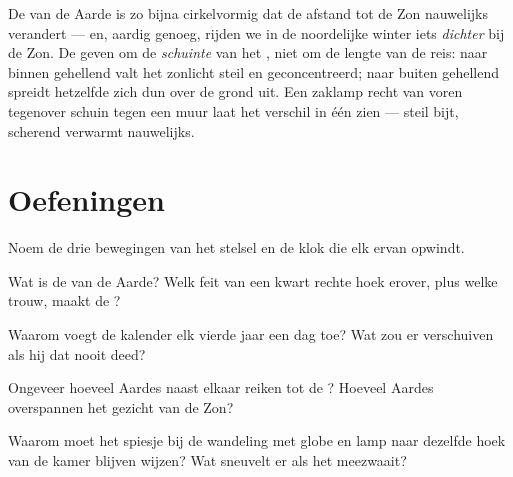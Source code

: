 \begin{remark}\label{rem:g6:sun-earth-moon:notdistance}
De  van de Aarde is zo bijna cirkelvormig dat de afstand
tot de Zon nauwelijks verandert --- en, aardig genoeg, rijden we in de
noordelijke winter iets \emph{dichter} bij de Zon. De  geven
om de \emph{schuinte} van het , niet om de lengte van de reis:
naar binnen gehellend valt het zonlicht steil en geconcentreerd; naar
buiten gehellend spreidt hetzelfde  zich dun over de grond uit.
Een zaklamp recht van voren tegenover schuin tegen een muur laat het
verschil in één  zien --- steil  bijt, scherend
 verwarmt nauwelijks.
\end{remark}

\section{Oefeningen}

\begin{exercise}[$\star$]\label{exo:g6:sun-earth-moon:1}
Noem de drie bewegingen van het stelsel en de klok die elk ervan
opwindt.
\end{exercise}

\begin{exercise}[$\star$]\label{exo:g6:sun-earth-moon:2}
Wat is de  van de Aarde? Welk feit van een kwart rechte hoek
erover, plus welke trouw, maakt de ?
\end{exercise}

\begin{exercise}[$\star$]\label{exo:g6:sun-earth-moon:3}
Waarom voegt de kalender elk vierde jaar een dag toe? Wat zou er
verschuiven als hij dat nooit deed?
\end{exercise}

\begin{exercise}[$\star$]\label{exo:g6:sun-earth-moon:4}
Ongeveer hoeveel Aardes naast elkaar reiken tot de ? Hoeveel
Aardes overspannen het gezicht van de Zon?
\end{exercise}

\begin{exercise}[$\star$]\label{exo:g6:sun-earth-moon:5}
Waarom moet het spiesje bij de wandeling met globe en lamp naar
dezelfde hoek van de kamer blijven wijzen? Wat sneuvelt er als het
meezwaait?
\end{exercise}

